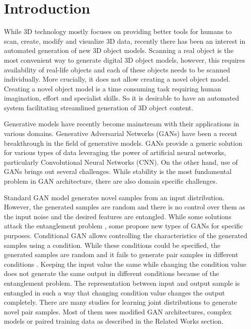 \documentclass[runningheads]{llncs}
\begin{document}
\section{Introduction}
\label{sect:intro}

While 3D technology mostly focuses on providing better tools for humans to scan, create, modify and visualize 3D data, recently there has been 
an interest in automated generation of new 3D object models. Scanning a real object is the most convenient way to generate digital 3D object
 models, however, this requires availability of real-life objects and each of these objects needs to be scanned individually. More crucially, 
 it does not allow creating a novel object model. Creating a novel object model is a time consuming task requiring human imagination, effort and 
 specialist skills. So it is desirable to have an automated system facilitating streamlined generation of 3D object content. 

Generative models have recently become mainstream with their applications in various domains. Generative Adversarial Networks (GANs) 
\cite{goodfellow2014generative} have been a recent breakthrough in the field of generative models. GANs provide a generic solution for various 
types of data leveraging the power of artificial neural networks, particularly Convolutional Neural Networks (CNN). On the other hand, use of 
GANs brings out several challenges. While stability is the most fundamental problem in GAN architecture, there are also domain specific challenges. 

Standard GAN model generates novel samples from an input distribution. However, the generated samples are random and there is no control over them as the input noise and the desired features are entangled. While some solutions attack the entanglement problem \cite{chen2016infogan}, some propose new types of GANs for specific purposes. Conditional GAN \cite{mirza2014conditional} allows controlling the characteristics of the generated samples using a condition. While these conditions could be specified, the generated samples are random and it fails to generate pair samples in different conditions \cite{liu2016coupled,mao2017aligngan}. Keeping the input value the same while changing the condition value does not generate the same output in different conditions because of the entanglement problem. The representation between input and output sample is entangled in such a way that changing condition value changes the output completely. There are many studies for learning joint distributions to generate novel pair samples. Most of them uses modified GAN architectures, complex models or paired training data as described in the Related Works section.
\end{document}
